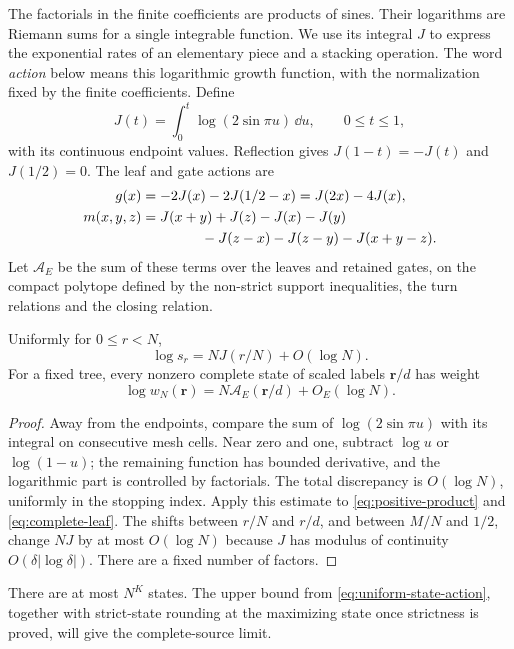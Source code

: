 The factorials in the finite coefficients are products of sines. Their logarithms are Riemann sums for a single integrable function. We use its integral $J$ to express the exponential rates of an elementary piece and a stacking operation. The word \emph{action} below means this logarithmic growth function, with the normalization fixed by the finite coefficients.
Define
\begin{equation}\label{eq:log-sine}
 J(t)=\int_0^t\log(2\sin\pi u)\,\dd u,\qquad 0\le t\le1,
\end{equation}
with its continuous endpoint values. Reflection gives $J(1-t)=-J(t)$ and $J(1/2)=0$. The leaf and gate actions are
\begin{align}
 g(x)&=-2J(x)-2J(1/2-x)=J(2x)-4J(x),\label{eq:g-action}\\
 m(x,y,z)&=J(x+y)+J(z)-J(x)-J(y)\notag\\
 &\hspace{15mm}-J(z-x)-J(z-y)-J(x+y-z).\label{eq:m-action}
\end{align}
Let $\mathcal A_E$ be the sum of these terms over the leaves and retained gates, on the compact polytope defined by the non-strict support inequalities, the turn relations and the closing relation.

\begin{lemma}\label{lem:factorial-action}
Uniformly for $0\le r<N$,
\[
 \log s_r=NJ(r/N)+O(\log N).
\]
For a fixed tree, every nonzero complete state of scaled labels $\mathbf r/d$ has weight
\begin{equation}\label{eq:uniform-state-action}
 \log w_N(\mathbf r)=N\mathcal A_E(\mathbf r/d)+O_E(\log N).
\end{equation}
\end{lemma}
\begin{proof}
Away from the endpoints, compare the sum of $\log(2\sin\pi u)$ with its integral on consecutive mesh cells. Near zero and one, subtract $\log u$ or $\log(1-u)$; the remaining function has bounded derivative, and the logarithmic part is controlled by factorials. The total discrepancy is $O(\log N)$, uniformly in the stopping index. Apply this estimate to \eqref{eq:positive-product} and \eqref{eq:complete-leaf}. The shifts between $r/N$ and $r/d$, and between $M/N$ and $1/2$, change $NJ$ by at most $O(\log N)$ because $J$ has modulus of continuity $O(\delta|\log\delta|)$. There are a fixed number of factors.
\end{proof}

There are at most $N^K$ states. The upper bound from \eqref{eq:uniform-state-action}, together with strict-state rounding at the maximizing state once strictness is proved, will give the complete-source limit.

